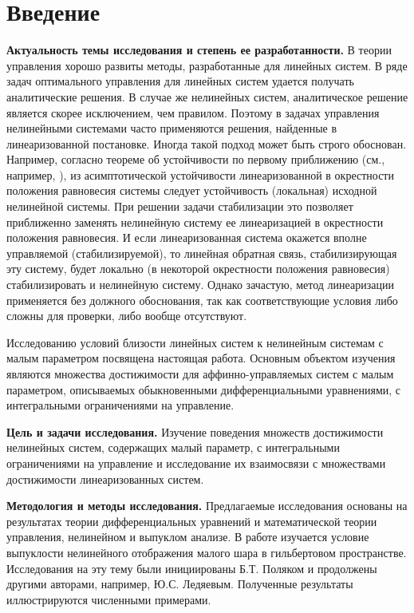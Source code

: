 \documentclass[../main.tex]{subfiles}
\begin{document}
\clearpage
\section*{Введение}
\textbf{Актуальность темы исследования и степень ее разработанности.} В теории управления хорошо развиты методы, разработанные для линейных систем. 
В ряде задач оптимального управления для линейных систем удается получать аналитические решения. 
В случае же нелинейных систем, аналитическое решение является скорее исключением, чем правилом. 
Поэтому в задачах управления нелинейными системами часто применяются решения, найденные в линеаризованной постановке. 
Иногда такой подход может быть строго обоснован. 
Например, согласно теореме об устойчивости по первому приближению (см., например, \cite{Barbashin_book}), из асимптотической устойчивости линеаризованной в окрестности положения равновесия системы следует устойчивость (локальная) исходной нелинейной системы. 
При решении задачи стабилизации это позволяет приближенно заменять нелинейную систему ее линеаризацией в окрестности положения равновесия. 
И если линеаризованная система окажется вполне управляемой (стабилизируемой), то линейная обратная связь, стабилизирующая эту систему, будет локально (в некоторой окрестности положения равновесия) стабилизировать и нелинейную систему\cite{Kras_add, Stab_lectures, Khalil, Polyak_book}.  
Однако зачастую, метод линеаризации применяется без должного обоснования, так как соответствующие условия либо сложны для проверки, либо вообще отсутствуют.

Исследованию условий близости линейных систем к нелинейным системам с малым параметром посвящена настоящая работа. 
Основным объектом изучения являются  множества достижимости для аффинно-управляемых систем с малым параметром, описываемых обыкновенными дифференциальными уравнениями, с интегральными ограничениями на управление. 

\textbf{Цель и задачи исследования.} Изучение поведения множеств достижимости нелинейных систем, содержащих малый параметр, с интегральными ограничениями на управление и исследование их взаимосвязи с множествами достижимости линеаризованных систем.

\textbf{Методология и методы исследования.} Предлагаемые исследования основаны на результатах теории дифференциальных уравнений и математической теории управления, нелинейном и выпуклом анализе.
В работе изучается условие выпуклости нелинейного отображения малого шара в гильбертовом пространстве.
Исследования на эту тему были инициированы Б.Т. Поляком\cite{Polyak2001} и продолжены другими авторами, например, Ю.С. Ледяевым\cite{Ledyaev}.
Полученные результаты иллюстрируются численными примерами.
\end{document}
